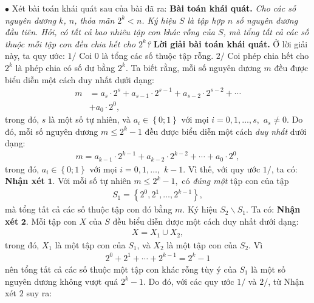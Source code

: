 \begin{multicols}{2}
	\vskip 0.05cm
	$\bullet$ Xét bài toán khái quát sau của bài đã ra:
	\vskip 0.05cm
	\textbf{\color{thachthuctoanhoc}Bài toán khái quát.} \textit{Cho các số nguyên dương $k$, $n$, thỏa mãn $2^k < n$. Ký hiệu $S$ là tập hợp $n$ số nguyên dương đầu tiên. Hỏi, có tất cả bao nhiêu tập con khác rỗng của $S$, mà tổng tất cả các số thuộc mỗi tập con đều chia hết cho  $2^k$?}
	\vskip 0.05cm
	\textbf{\color{thachthuctoanhoc}Lời giải bài toán khái quát.}
	\vskip 0.05cm
	Ở lời giải này, ta quy ước:
	\vskip 0.05cm
	$1/$ Coi $0$ là tổng các số thuộc tập rỗng.
	\vskip 0.05cm
	$2/$ Coi phép chia hết cho $2^k$  là phép chia có số dư bằng  $2^k$.
	\vskip 0.05cm
	Ta biết rằng, mỗi số nguyên dương $m$ đều được biểu diễn một cách duy nhất dưới dạng:
	\begin{align*}
		m &= {a_s} \cdot {2^s} + {a_{s - 1}} \cdot {2^{s - 1}} + {a_{s - 2}} \cdot {2^{s - 2}} +  \cdots  \\
		&+ {a_0} \cdot {2^0},
	\end{align*}
	trong đó, $s$ là một số tự nhiên, và  ${a_i} \in \left\{ {0;1} \right\}$ với mọi  $i = 0,1, \ldots ,s, $ ${a_s} \ne 0.$
	\vskip 0.05cm  
	Do đó, mỗi số nguyên dương  $m \le {2^k} - 1$ đều được biểu diễn một cách \textit{duy nhất} dưới dạng:
	\begin{align*}
		m = {a_{k - 1}} \cdot {2^{k - 1}} + {a_{k - 2}} \cdot {2^{k - 2}} +  \cdots  + {a_0} \cdot {2^0},
	\end{align*}
	trong đó, ${a_i} \in \left\{ {0;1} \right\}$  với mọi  $i = 0,1, \ldots,$ $k - 1$.
	\vskip 0.05cm
	Vì thế, với quy ước $1/$, ta có:
	\vskip 0.05cm
	\textbf{\color{thachthuctoanhoc}Nhận xét} $\pmb{1.}$ Với mỗi số tự nhiên $m \le {2^k} - 1,$  có \textit{đúng một} tập con của tập
	\begin{align*}
		{S_1} = \left\{ {{2^0},{2^1}, \ldots ,{2^{k - 1}}} \right\},
	\end{align*}
	mà tổng tất cả các số thuộc tập con đó bằng  $m$.
	\vskip 0.05cm
	Ký hiệu ${S_2} \backslash {S_1}$.  Ta có:
	\vskip 0.05cm
	\textbf{\color{thachthuctoanhoc}Nhận xét} $\pmb{2.}$ Mỗi tập con $X$ của $S$ đều biểu diễn được một cách duy nhất dưới dạng:
	\begin{align*}
		X = {X_1} \cup {X_2},
	\end{align*}
	trong đó, $X_1$  là một tập con của  $S_1$, và $X_2$  là một tập con của $S_2$.
	\vskip 0.05cm 
	Vì
	\begin{align*}
		{2^0} + {2^1} +  \cdots  + {2^{k - 1}} = {2^k} - 1
	\end{align*}
	nên tổng tất cả các số thuộc một tập con khác rỗng tùy ý của $S_1$  là một số nguyên dương không vượt quá $2^k -1$.  Do đó, với các quy ước $1/$ và $2/$, từ Nhận xét $2$ suy ra:

\end{multicols}
